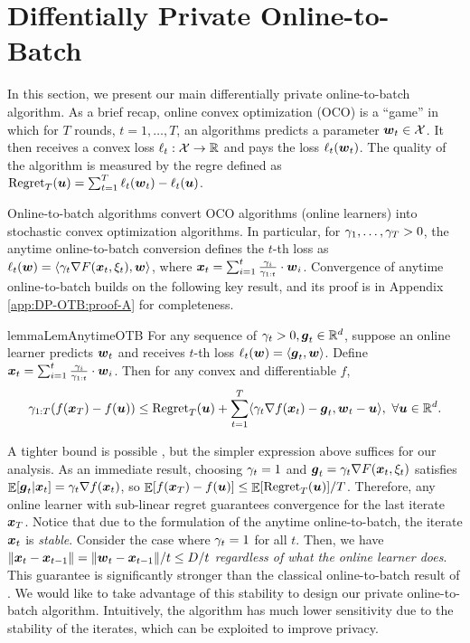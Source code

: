 \section{Diffentially Private Online-to-Batch}
\label{sec:DP-OTB_OTB}

In this section, we present our main differentially private online-to-batch algorithm. As a brief recap, online convex optimization (OCO) is a ``game'' in which for $T$ rounds, $t=1,\ldots,T$, an algorithms predicts a parameter ${\boldsymbol{w}}_t\in {\cal X}$. It then receives a convex loss $\ell_t:{\cal X}\to \mathbb R$ and pays the loss $\ell_t({\boldsymbol{w}}_t)$. The quality of the algorithm is measured by the regre defined as $\mathrm{Regret}_T({\boldsymbol{u}})=\sum_{t=1}^T \ell_t({\boldsymbol{w}}_t)-\ell_t({\boldsymbol{u}})$.

Online-to-batch algorithms \citep{cesa2004generalization} convert OCO algorithms (online learners) into stochastic convex optimization algorithms. In particular, for $\gamma_1,\ldots,\gamma_T>0$, the anytime online-to-batch conversion \citep{cutkosky2019anytime} defines the $t$-th loss as $\ell_t({\boldsymbol{w}})=\langle \gamma_t\nabla F({\boldsymbol{x}}_t,\xi_t), {\boldsymbol{w}}\rangle$, where ${\boldsymbol{x}}_t=\sum_{i=1}^t \frac{\gamma_i}{\gamma_{1:t}}\cdot {\boldsymbol{w}}_i$. Convergence of anytime online-to-batch builds on the following key result, and its proof is in Appendix \ref{app:DP-OTB:proof-A} for completeness.

\begin{restatable}{lemma}{LemAnytimeOTB}
\label{lem:DP-OTB:basic-lemma}
For any sequence of $\gamma_t>0, {\boldsymbol{g}}_t\in\mathbb R^d$, suppose an online learner predicts ${\boldsymbol{w}}_t$ and receives $t$-th loss $\ell_t({\boldsymbol{w}})=\langle {\boldsymbol{g}}_t, {\boldsymbol{w}}\rangle$. Define ${\boldsymbol{x}}_t=\sum_{i=1}^t \frac{\gamma_i}{\gamma_{1:t}}\cdot{\boldsymbol{w}}_i$. Then for any convex and differentiable $f$,
\begin{align*}
    \gamma_{1:T}(f({\boldsymbol{x}}_T)-f({\boldsymbol{u}})) \leq \mathrm{Regret}_T({\boldsymbol{u}}) + \sum_{t=1}^T \langle \gamma_t\nabla f({\boldsymbol{x}}_t) - {\boldsymbol{g}}_t, {\boldsymbol{w}}_t-{\boldsymbol{u}}\rangle, \ \forall {\boldsymbol{u}}\in \mathbb R^d.
\end{align*}
\end{restatable}

A tighter bound is possible \citep{joulani2020simpler}, but the simpler expression above suffices for our analysis.
As an immediate result, choosing $\gamma_t=1$ and ${\boldsymbol{g}}_t=\gamma_t\nabla F({\boldsymbol{x}}_t,\xi_t)$ satisfies $\mathop{\mathbb{E}}[{\boldsymbol{g}}_t|{\boldsymbol{x}}_t]=\gamma_t\nabla f({\boldsymbol{x}}_t)$, so $\mathop{\mathbb{E}}[f({\boldsymbol{x}}_T)-f({\boldsymbol{u}})]\le \mathop{\mathbb{E}}[\mathrm{Regret}_T({\boldsymbol{u}})]/T$. Therefore, any online learner with sub-linear regret guarantees convergence for the last iterate ${\boldsymbol{x}}_T$. Notice that due to the formulation of the anytime online-to-batch, the iterate ${\boldsymbol{x}}_t$ is \emph{stable}. Consider the case where $\gamma_t = 1$ for all $t$. Then, we have $\|{\boldsymbol{x}}_t-{\boldsymbol{x}}_{t-1}\|= \|{\boldsymbol{w}}_t-{\boldsymbol{x}}_{t-1}\|/t\le D/t$ \emph{regardless of what the online learner does}. This guarantee is significantly stronger than the classical online-to-batch result of \cite{cesa2004generalization}. We would like to take advantage of this stability to design our private online-to-batch algorithm. Intuitively, the algorithm has much lower sensitivity due to the stability of the iterates, which can be exploited to improve privacy.


